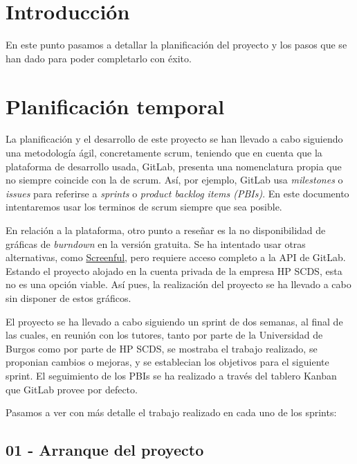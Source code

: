 
\section{Introducción}

En este punto pasamos a detallar la planificación del proyecto y los pasos que se han dado para poder completarlo con éxito.

\section{Planificación temporal}

La planificación y el desarrollo de este proyecto se han llevado a cabo siguiendo una metodología ágil, concretamente scrum, teniendo que en cuenta que la plataforma de desarrollo usada, GitLab, presenta una nomenclatura propia que no siempre coincide con la de scrum. Así, por ejemplo, GitLab usa \textit{milestones} o \textit{issues} para referirse a \textit{sprints} o \textit{product backlog items (PBIs)}. En este documento intentaremos usar los terminos de scrum siempre que sea posible.

En relación a la plataforma, otro punto a reseñar es la no disponibilidad de gráficas de \textit{burndown} en la versión gratuita. Se ha intentado usar otras alternativas, como \href{https://screenful.com/}{Screenful}, pero requiere acceso completo a la API de GitLab. Estando el proyecto alojado en la cuenta privada de la empresa HP SCDS, esta no es una opción viable. Así pues, la realización del proyecto se ha llevado a cabo sin disponer de estos gráficos.

El proyecto se ha llevado a cabo siguiendo un sprint de dos semanas, al final de las cuales, en reunión con los tutores, tanto por parte de la Universidad de Burgos como por parte de HP SCDS, se mostraba el trabajo realizado, se proponian cambios o mejoras, y se establecian los objetivos para el siguiente sprint. El seguimiento de los PBIs se ha realizado a través del tablero Kanban que GitLab provee por defecto.

Pasamos a ver con más detalle el trabajo realizado en cada uno de los sprints:

\subsection{01 - Arranque del proyecto \newline
[10/02/2020 -– 17/02/2020]}

